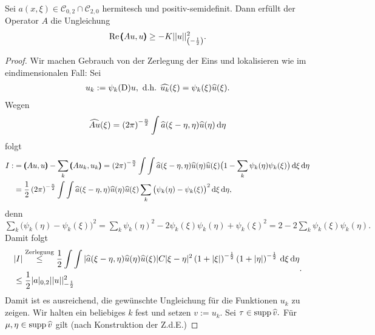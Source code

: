 \begin{thm}
Sei $a(x,\xi)\in\mathcal{C}_{0,2}\cap\mathcal{C}_{2,0}$ hermitesch und positiv-semidefinit. Dann erfüllt der Operator $A$ die Ungleichung
\begin{align}
	\operatorname{Re} \pmb(Au,u\pmb) \ge - K\vert\vert u\vert\vert_{\left(-\frac{1}{2}\right)}^2.
\end{align}
\begin{proof}
	Wir machen Gebrauch von der Zerlegung der Eins und lokalisieren wie im eindimensionalen Fall: Sei
	\begin{align}
		u_k:= \psi_k(\mathrm D)u, \text{ d.h. } \widehat{u_k}(\xi) = \psi_k(\xi) \widehat{u}(\xi).
\end{align}
Wegen 
\begin{align}
	\widehat{Au}(\xi) = \left(2\pi\right)^{-\frac{n}{2}}\int \widehat{a}(\xi-\eta,\eta)\widehat{u}(\eta)\,\mathrm d \eta
\end{align}	 
folgt
\begin{align}
	\begin{split} I:&=\pmb(Au,u\pmb)-\sum\limits_k \pmb(Au_k,u_k\pmb) = \left(2\pi\right)^{-\frac{n}{2}}\int\int \widehat{a}(\xi-\eta,\eta)\widehat{u}(\eta)\widehat{u}(\xi)\big(1-\sum\limits_k \psi_k(\eta)\psi_k(\xi)\big)\,\mathrm d \xi\,\mathrm d\eta\\
	&= \frac{1}{2}\left(2\pi\right)^{-\frac{n}{2}} \int\int \widehat{a}(\xi-\eta,\eta)\widehat{u}(\eta)\widehat{u}(\xi)\sum\limits_k\big(\psi_k(\eta)-\psi_k(\xi)\big)^2\,\mathrm d \xi\,\mathrm d\eta,
\end{split}
\end{align}
denn $\sum\limits_k\big(\psi_k(\eta)-\psi_k(\xi)\big)^2=\sum\limits_k\psi_k(\eta)^2-2\psi_k(\xi)\psi_k(\eta)+\psi_k(\xi)^2=2-2\sum\limits_k\psi_k(\xi)\psi_k(\eta).$
Damit folgt
\begin{align}
\begin{split}	&\vert I\vert \overset{\text{Zerlegung}}{\le}\frac{1}{2}\int\int\vert\widehat{a}(\xi-\eta,\eta)\widehat{u}(\eta)\widehat{u}(\xi)\vert C \vert\xi-\eta\vert^2\left(1+\vert \xi\vert\right)^{-\frac{1}{2}} \left(1+\vert \eta\vert\right)^{-\frac{1}{2}}\,\mathrm d \xi \,\mathrm d \eta\\ 
& \le \frac{1}{2}\vert a\vert_{0,2}\vert\vert u\vert\vert_{-\frac{1}{2}}^2
\end{split}.
\end{align}
Damit ist es ausreichend, die gewünschte Ungleichung für die Funktionen $u_k$ zu zeigen. Wir halten ein beliebiges $k$ fest und setzen $v:= u_k.$ Sei $\tau\in \operatorname{supp} \widehat{v}.$ Für $\mu, \eta \in \operatorname{supp} \widehat{v}$ gilt (nach Konstruktion der Z.d.E.)

\end{proof}
\end{thm}
